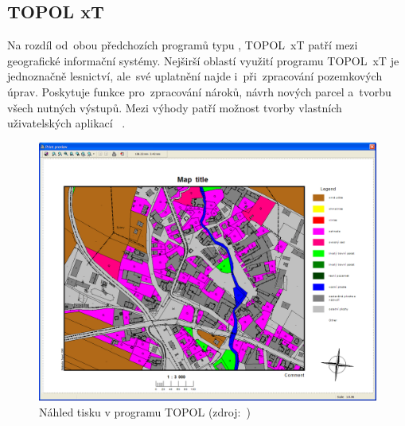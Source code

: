 \subsection{TOPOL xT}
\label{topol_xt}

Na rozdíl od~obou předchozích programů typu , TOPOL~xT patří mezi geografické informační systémy. Nejširší oblastí využití programu TOPOL~xT je jednoznačně lesnictví, ale~své uplatnění najde i~při~zpracování pozemkových úprav. Poskytuje funkce pro~zpracování nároků, návrh nových parcel a~tvorbu všech nutných výstupů. Mezi výhody patří možnost tvorby vlastních uživatelských aplikací \citep{topol}~\citep{pu_skripta}.

	\begin{figure}[H]
		\centering
		\includegraphics[width=.8\textwidth]{./pictures/topol.png}
		\caption[Náhled tisku v programu TOPOL xT]{Náhled tisku v programu TOPOL (zdroj:~\citep{topol})}
		\label{fig:topol_obrazek}
 	\end{figure}
